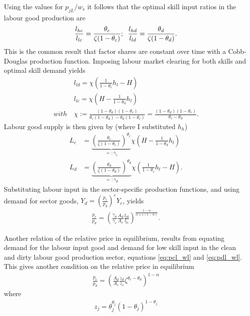 Using the values for $p_{jL}/w_s$ it follows that the optimal skill input ratios in the labour good production are
\begin{align*}
\frac{l_{hc}}{l_{lc}}=\frac{\theta_c}{\zeta (1-\theta_c)}; \hspace{2mm} \frac{l_{hd}}{l_{ld}}=\frac{\theta_d}{\zeta (1-\theta_d)}.
\end{align*}
This is the common result that  factor shares 
 are constant over time with a Cobb-Douglas production function. 
Imposing labour market clearing for both skills and optimal skill demand  yields 
\begin{align}
&l_{ld}=\chi\left(\frac{1}{1-\theta_c}h_l-H\right)\label{eq:lld}\\ %
& l_{lc}=\chi \left(H-\frac{1}{1-\theta_d}h_l\right)\label{eq:llc}\\
with \ & \chi:= \frac{(1-\theta_d)(1-\theta_c)}{\theta_c(1-\theta_d)-\theta_d(1-\theta_c)}=\frac{(1-\theta_d)(1-\theta_c)}{\theta_c-\theta_d}.
\end{align}
Labour good supply is then given by (where I substituted $h_h$)
\begin{align}
L_c&=\underbrace{\left(\frac{\theta_c}{\zeta(1-\theta_c)}\right)^{\theta_c}}_{=:\gamma_c}\chi\left(H -\frac{1}{1-\theta_d} h_l\right)\label{eq:lab_inputc} \\
L_d&= \underbrace{\left(\frac{\theta_d}{\zeta (1-\theta_d)}\right)^{\theta_d}}_{=:\gamma_d}\chi\left(\frac{1}{1-\theta_c} h_l-H\right).\label{eq:lab_inputd}
\end{align}
Substituting labour input in the sector-specific production functions, and using demand for sector goods, $Y_d=\left(\frac{p_c}{p_d}\right)^\varepsilon Y_c$, yields
\begin{align}\label{eq:price_ratio_output}
\frac{p_c}{p_d} =\left(\frac{\gamma_d}{\gamma_c}\frac{A_d}{A_c}\frac{l_{ld}}{l_{lc}}\right)^{\frac{1-\alpha}{\alpha+\varepsilon(1-\alpha)}}.
\end{align}

Another relation of the relative price in equilibrium, results from equating demand for the labour input good and  demand for low skill input in the clean and dirty labour good production sector, equations \ref{eq:pcl_wl} and \ref{eq:pdl_wl}. This gives another condition on the relative price in equilibrium
\begin{align}\label{eq:price_ratio_labourinput}
\frac{p_c}{p_d}= \left(\frac{A_d}{A_c}\frac{z_d}{z_c}\zeta^{\theta_c-\theta_d}\right)^{1-\alpha}
\end{align}
where
\begin{align*}
z_j=\theta_j^{\theta_j}(1-\theta_j)^{1-\theta_j}
\end{align*}


